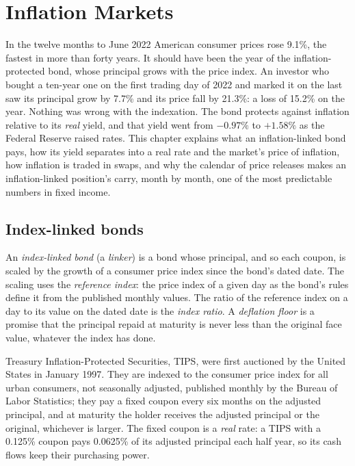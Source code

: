 \chapter{Inflation Markets}\label{ch:m2:inflation-markets}

In the twelve months to June 2022 American consumer prices rose 9.1\%, the
fastest in more than forty years. It should have been the year of the
inflation-protected bond, whose principal grows with the price index. An
investor who bought a ten-year one on the first trading day of 2022 and marked
it on the last saw its principal grow by 7.7\% and its price fall by 21.3\%:
a loss of 15.2\% on the year. Nothing was wrong with the indexation. The bond
protects against inflation relative to its \emph{real} yield, and that yield
went from $-0.97\%$ to $+1.58\%$ as the Federal Reserve raised rates. This
chapter explains what an inflation-linked bond pays, how its yield separates
into a real rate and the market's price of inflation, how inflation is traded
in swaps, and why the calendar of price releases makes an inflation-linked
position's carry, month by month, one of the most predictable numbers in
fixed income.

\section{Index-linked bonds}

\begin{definition}\label{def:m2:inflation-markets:linker}
An \emph{index-linked bond} (a \emph{linker}) is a bond
whose principal, and so each coupon, is scaled by the growth of a consumer
price index since the bond's dated date. The scaling uses the
\emph{reference index}: the price index of a given day
as the bond's rules define it from the published monthly values. The ratio of
the reference index on a day to its value on the dated date is the
\emph{index ratio}. A \emph{deflation floor} is a promise
that the principal repaid at maturity is never less than the original face
value, whatever the index has done.
\end{definition}

Treasury Inflation-Protected Securities, TIPS, were first auctioned by the
United States in January 1997. They are indexed to the consumer price index
for all urban consumers, not seasonally adjusted, published monthly by the
Bureau of Labor Statistics; they pay a fixed coupon every six months on the
adjusted principal, and at maturity the holder receives the adjusted principal
or the original, whichever is larger. The fixed coupon is a \emph{real} rate:
a TIPS with a 0.125\% coupon pays 0.0625\% of its adjusted principal each half
year, so its cash flows keep their purchasing power.

